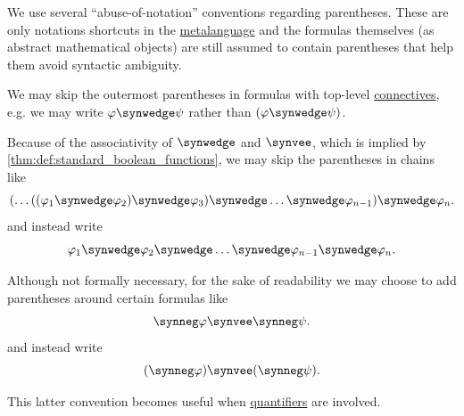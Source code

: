 \begin{remark}\label{rem:propositional_formula_notation_conventions}
  We use several \enquote{abuse-of-notation} conventions regarding parentheses. These are only notations shortcuts in the \hyperref[con:metalogic]{metalanguage} and the formulas themselves (as abstract mathematical objects) are still assumed to contain parentheses that help them avoid syntactic ambiguity.

  \begin{thmenum}
     We may skip the outermost parentheses in formulas with top-level \hyperref[def:propositional_alphabet/connectives]{connectives}, e.g. we may write \( \varphi \synwedge \psi \) rather than \( (\varphi \synwedge \psi) \).

     Because of the associativity of \( \synwedge \) and \( \synvee \), which is implied by \cref{thm:def:standard_boolean_functions}, we may skip the parentheses in chains like
    \begin{equation*}
      ( \ldots ((\varphi_1 \synwedge \varphi_2) \synwedge \varphi_3) \synwedge \ldots \synwedge \varphi_{n-1} ) \synwedge \varphi_n.
    \end{equation*}
    and instead write
    \begin{equation*}
      \varphi_1 \synwedge \varphi_2 \synwedge \ldots \synwedge \varphi_{n-1} \synwedge \varphi_n.
    \end{equation*}

     Although not formally necessary, for the sake of readability we may choose to add parentheses around certain formulas like
    \begin{equation*}
      \synneg \varphi \synvee \synneg \psi.
    \end{equation*}
    and instead write
    \begin{equation*}
      (\synneg \varphi) \synvee (\synneg \psi).
    \end{equation*}

    This latter convention becomes useful when \hyperref[con:predicate_logic/quantifiers]{quantifiers} are involved.
  \end{thmenum}
\end{remark}

